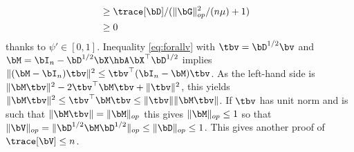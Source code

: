 \documentclass{colt2022} %
\renewenvironment{proof}[1][]
{
    \begin{newproof}
    \ifthenelse{\equal{#1}{}}{ }{\textbf{(#1) }}%
}{
    \end{newproof}
}
\numberwithin{equation}{section}
\begin{document}
\begin{proof}
\begin{align}
        \nonumber
        \\&\ge \trace[\bD]/(\|\bG\|_{op}^2/(n\mu) + 1)
            \label{eq:lower-bond-trace-V}
        \\&\ge 0
        \nonumber
    \end{align}
    thanks to $\psi'\in[0,1]$.
    Inequality \eqref{eq:forallv} with $\tbv = \bD^{1/2}\bv$
    and $\bM = \bI_n - \bD^{1/2}\bX\hbA\bX^\top\bD^{1/2}$ 
    implies
    $
    \|(\bM-\bI_n) \tbv\|^2 \le \tbv^\top(\bI_n - \bM)\tbv$.
    As the left-hand side is
    $\|\bM\tbv\|^2 - 2 \tbv^\top\bM\tbv + \|\tbv\|^2$,
    this yields
    $\|\bM\tbv\|^2
    \le \tbv^\top\bM \tbv
    \le \|\tbv\| \|\bM\tbv\|$.
    If $\tbv$ has unit norm and is such that $\|\bM\tbv\|=\|\bM\|_{op}$
    this gives $\|\bM\|_{op}\le 1$ so that
    $\|\bV\|_{op}=\|\bD^{1/2}\bM\bD^{1/2}\|_{op}\le \|\bD\|_{op}\le 1$.
    This gives another proof of $\trace[\bV]\le n$.
\end{proof}
\end{document}
